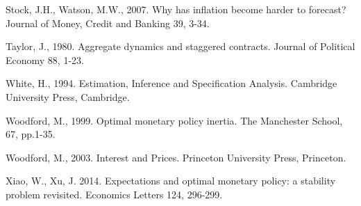 \begin{thebibliography}{}
{
Stock, J.H., Watson, M.W., 2007. Why has inflation become harder
to forecast? {Journal of Money, Credit and Banking} 39, 3-34.



%
%
%
%
%
\bibitem{} Taylor, J., 1980. Aggregate dynamics and staggered
contracts. Journal of Political Economy 88, 1-23.


 White, H., 1994. Estimation, Inference and Specification
Analysis. Cambridge University Press, Cambridge.

\bibitem{} Woodford, M., 1999. Optimal monetary policy inertia. The Manchester School, 67, pp.1-35.

 Woodford, M., 2003. Interest and Prices. Princeton University Press,
Princeton.



\bibitem{} Xiao, W., Xu, J. 2014.
Expectations and optimal monetary policy: a stability problem revisited.
{Economics Letters} 124, 296-299.













}
\end{thebibliography}

